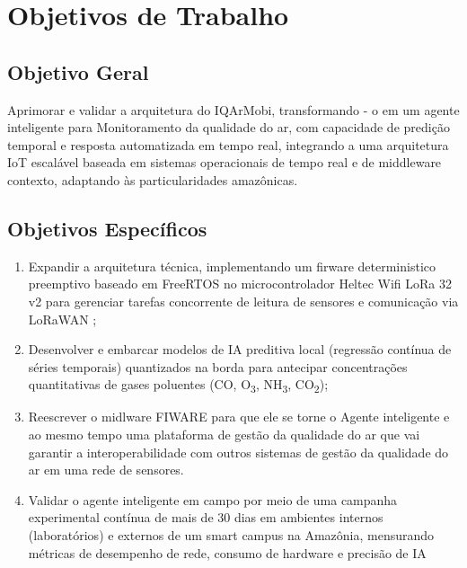 \chapter{Objetivos de Trabalho}
\section{Objetivo Geral}
Aprimorar e validar a arquitetura do IQArMobi, 
transformando - o em um agente inteligente para Monitoramento
da qualidade do ar, com capacidade de predição temporal e resposta automatizada
em tempo real, integrando a uma arquitetura IoT escalável baseada em sistemas
operacionais de tempo real e de middleware contexto, adaptando às particularidades
amazônicas.
\section{Objetivos Específicos}
\begin{enumerate}
    \item Expandir a arquitetura técnica, implementando um firware deterministico
          preemptivo baseado em FreeRTOS no microcontrolador Heltec Wifi LoRa 32 v2
          para gerenciar tarefas concorrente de leitura de sensores e comunicação via LoRaWAN
          \cite{alves2025freertos};
    \item Desenvolver e embarcar modelos de IA preditiva local 
          (regressão contínua de séries temporais) quantizados na 
          borda para antecipar concentrações quantitativas de gases
          poluentes (CO, O\textsubscript{3}, NH\textsubscript{3}, CO\textsubscript{2});
    \item Reescrever o midlware FIWARE para que ele se torne o Agente inteligente e ao mesmo tempo
          uma plataforma de gestão da qualidade do ar
          que vai garantir a interoperabilidade com outros sistemas de gestão da qualidade do ar
          em uma rede de sensores.  
    \item Validar o agente inteligente em campo por meio de uma campanha 
          experimental contínua de mais de 30 dias em 
          ambientes internos (laboratórios) e externos de um 
          smart campus na Amazônia, mensurando métricas de desempenho de 
          rede, consumo de hardware e precisão de IA
\end{enumerate}